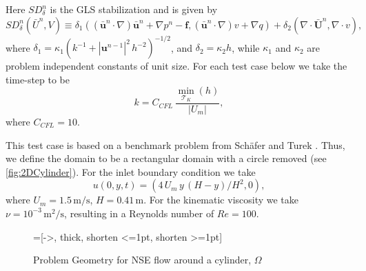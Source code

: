     Here $SD_{\delta}^n$ is the GLS stabilization and is given by
    \begin{equation}
        SD_{\delta}^n(\bar{U}^n, V) \equiv
        \delta_1 (\left(\bar{\mathbf{u}}^n \cdot \nabla \right) \bar{\mathbf{u}}^n
            + \nabla p^n - \mathbf{f},
        \left(\bar{\mathbf{u}}^n \cdot \nabla \right) v + \nabla q)
        + \delta_2 (\nabla \cdot \bar{\mathbf{U}}^n, \nabla \cdot v),
    \label{eqn:NSEStabilization}
    \end{equation}
    where $\delta_1 = \kappa_1 (k^{-1} + |\mathbf{u}^{n-1}|^2\, h^{-2})^{-1/2}$, and
    $\delta_2 = \kappa_2 h$, while $\kappa_1$ and $\kappa_2$ are problem independent
    constants of unit size. For each test case below we take the time-step to be
    \begin{equation*}
    k = C_{CFL}\, \frac{\min_{\mathcal{T}_K}(h)}{|U_m|},
    \end{equation*}
    where $C_{CFL}=10$.

    This test case is based on a benchmark problem from Sch\"afer and Turek
    \cite[Test case 2D-2]{Schaefer1996}. Thus, we define the domain to be a
    rectangular domain with a circle removed (see \autoref{fig:2DCylinder}). For
    the inlet boundary condition we take
    \begin{equation}
        u(0,y,t) = (4\, U_m\,y\, (H - y)/H^2, 0),
        \label{eqn:2DInlet}
    \end{equation}
    where $U_m = 1.5\, \text{m/s}$, $H = 0.41\, \text{m}$. For the kinematic
    viscosity we take $\nu = 10^{-3}\, \text{m}^2\text{/s}$, resulting in a
    Reynolds number of $Re=100$.

    \begin{figure}[H]
        \centering
        =[->, thick, shorten <=1pt, shorten >=1pt]
        \caption{Problem Geometry for NSE flow around a cylinder, $\Omega$}
        \label{fig:2DCylinder}
    \end{figure}

